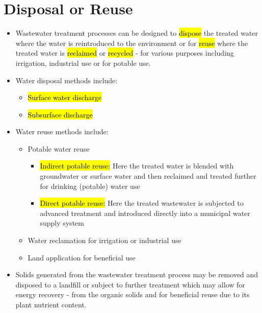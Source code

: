 \section{Disposal or Reuse}

\begin{itemize}
\item Wastewater treatment processes can be designed to \hl{dispose} the treated water where the water is reintroduced to the environment or for \hl{reuse} where the treated water is \hl{reclaimed} or \hl{recycled} - for various purposes including irrigation, industrial use or for potable use.
\item Water disposal methods include:\\
\begin{itemize}
\item \hl{Surface water discharge}
\item \hl{Subsurface discharge}
\end{itemize}
\item Water reuse methods include:\\
\begin{itemize}
\item Potable water reuse
\begin{itemize}
\item \hl{Indirect potable reuse:}  Here the treated water is blended with groundwater or surface water and then reclaimed and treated further 
for drinking (potable) water use
\item \hl{Direct potable reuse:}  Here the treated wastewater is subjected to advanced treatment and introduced directly into a municipal water supply system
\end{itemize}
\item Water reclamation for irrigation or industrial use\\
\item Land application for beneficial use\\
\end{itemize}
\item Solids generated from the wastewater treatment process may be removed and disposed to a landfill or subject to further treatment which may allow for energy recovery - from the organic solids and for beneficial reuse due to its plant nutrient content.\\
\end{itemize}